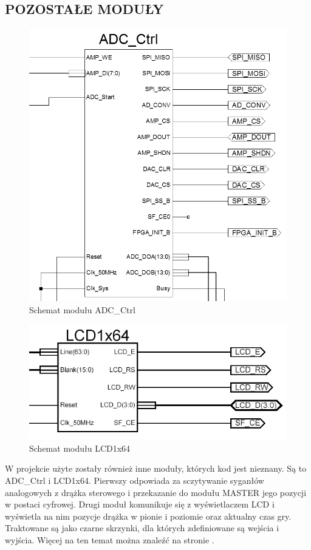 \documentclass[11pt]{article}
\begin{document}
\subsection{POZOSTAŁE MODUŁY}

\begin{figure}[H]
\centering
\includegraphics[scale=.5]{ADC_Ctrl.PNG}
\caption{Schemat modułu ADC\_Ctrl}
\end{figure}

\begin{figure}[H]
\centering
\includegraphics[scale=.5]{LCD1x64.PNG}
\caption{Schemat modułu LCD1x64}
\end{figure}

W projekcie użyte zostały również inne moduły, których kod jest nieznany.
Są to ADC\_Ctrl i LCD1x64.
Pierwszy odpowiada za sczytywanie syganłów analogowych z drążka sterowego i przekazanie do modułu MASTER jego pozycji w postaci cyfrowej.
Drugi moduł komunikuje się z wyświetlaczem LCD i wyświetla na nim pozycje drążka w pionie i poziomie oraz aktualny czas gry.
Traktowane są jako czarne skrzynki, dla których zdefiniowane są wejścia i wyjścia.
Więcej na ten temat można znaleźć na stronie \cite{pb}.
\end{document}
